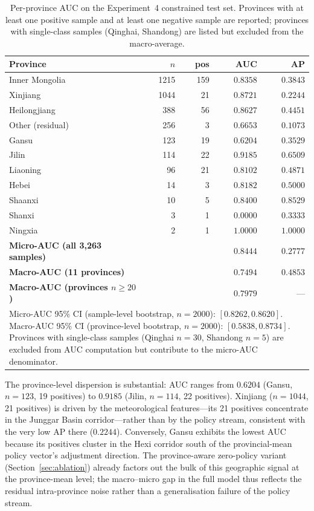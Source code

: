\documentclass[12pt, a4paper]{article}
\begin{document}
\begin{table}[H]
\centering
\caption{Per-province AUC on the Experiment~4 constrained test
set. Provinces with at least one positive sample and at least
one negative sample are reported; provinces with single-class
samples (Qinghai, Shandong) are listed but excluded from the
macro-average.}
\label{tab:per_province_auc}
\small
\begin{tabular}{lrrrr}
\toprule
\textbf{Province} & \textbf{$n$} & \textbf{pos} & \textbf{AUC} & \textbf{AP} \\
\midrule
Inner Mongolia  & 1215 & 159 & $\mathbf{0.8358}$ & $0.3843$ \\
Xinjiang        & 1044 &  21 & $0.8721$ & $0.2244$ \\
Heilongjiang    &  388 &  56 & $0.8627$ & $0.4451$ \\
Other (residual)&  256 &   3 & $0.6653$ & $0.1073$ \\
Gansu           &  123 &  19 & $0.6204$ & $0.3529$ \\
Jilin           &  114 &  22 & $0.9185$ & $0.6509$ \\
Liaoning        &   96 &  21 & $0.8102$ & $0.4871$ \\
Hebei           &   14 &   3 & $0.8182$ & $0.5000$ \\
Shaanxi         &   10 &   5 & $0.8400$ & $0.8529$ \\
Shanxi          &    3 &   1 & $0.0000$ & $0.3333$ \\
Ningxia         &    2 &   1 & $1.0000$ & $1.0000$ \\
\midrule
\textbf{Micro-AUC (all 3{,}263 samples)} & & & $\mathbf{0.8444}$ & $0.2777$ \\
\textbf{Macro-AUC (11 provinces)} & & & $\mathbf{0.7494}$ & $0.4853$ \\
\textbf{Macro-AUC (provinces $n\geq 20$)} & & & $\mathbf{0.7979}$ & --- \\
\bottomrule
\multicolumn{5}{p{0.85\textwidth}}{\small
  Micro-AUC 95\% CI (sample-level bootstrap, $n=2000$):
  $[0.8262, 0.8620]$. Macro-AUC 95\% CI (province-level
  bootstrap, $n=2000$): $[0.5838, 0.8734]$. Provinces with
  single-class samples (Qinghai $n=30$, Shandong $n=5$)
  are excluded from AUC computation but contribute to the
  micro-AUC denominator.} \\
\end{tabular}
\end{table}

The province-level dispersion is substantial: AUC ranges from
$0.6204$ (Gansu, $n=123$, 19 positives) to $0.9185$ (Jilin,
$n=114$, 22 positives). Xinjiang ($n=1044$, 21 positives) is
driven by the meteorological features---its 21 positives
concentrate in the Junggar Basin corridor---rather than by the
policy stream, consistent with the very low AP there
($0.2244$). Conversely, Gansu exhibits the lowest AUC because
its positives cluster in the Hexi corridor south of the
provincial-mean policy vector's adjustment direction. The
province-aware zero-policy variant (Section~\ref{sec:ablation})
already factors out the bulk of this geographic signal at the
province-mean level; the macro--micro gap in the full model
thus reflects the residual intra-province noise rather than a
generalisation failure of the policy stream.
\end{document}
